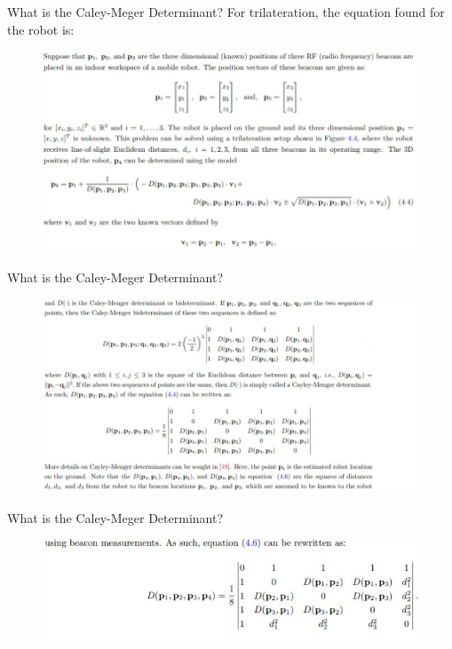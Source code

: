 \documentclass{beamer}
\begin{document}
\begin{frame}{What is the Caley-Meger Determinant?}
For trilateration, the equation found for the robot is:

\begin{figure}
\includegraphics[scale=0.6]{figs/img/Lu_Images/caleyMegerEquations1}
\end{figure}  

\end{frame}

\begin{frame}{What is the Caley-Meger Determinant?}
\begin{figure}
\includegraphics[scale=0.6]{figs/img/Lu_Images/caleyMegerEquations2}
\end{figure}  

\end{frame}

\begin{frame}{What is the Caley-Meger Determinant?}
\begin{figure}
\centering
\includegraphics[scale=0.8]{figs/img/Lu_Images/caleyMegerEquations3}
\end{figure}  

\end{frame}
\end{document}
